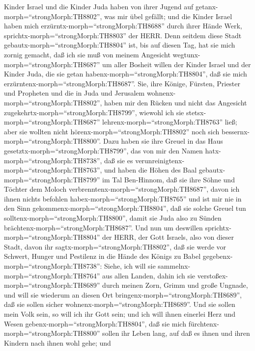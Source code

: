 Kinder Israel und die Kinder Juda haben von ihrer Jugend auf
getanx-morph=``strongMorph:TH8802'', was mir übel gefällt; und die
Kinder Israel haben mich erzürntx-morph=``strongMorph:TH8688'' durch
ihrer Hände Werk, sprichtx-morph=``strongMorph:TH8803'' der HERR.
 Denn seitdem diese Stadt
gebautx-morph=``strongMorph:TH8804'' ist, bis auf diesen Tag, hat sie
mich zornig gemacht, daß ich sie muß von meinem Angesicht
wegtunx-morph=``strongMorph:TH8687''  um aller Bosheit
willen der Kinder Israel und der Kinder Juda, die sie getan
habenx-morph=``strongMorph:TH8804'', daß sie mich
erzürntenx-morph=``strongMorph:TH8687''. Sie, ihre Könige, Fürsten,
Priester und Propheten und die in Juda und Jerusalem
wohnenx-morph=``strongMorph:TH8802'',  haben mir den Rücken
und nicht das Angesicht zugekehrtx-morph=``strongMorph:TH8799'', wiewohl
ich sie stetsx-morph=``strongMorph:TH8687''
lehrenx-morph=``strongMorph:TH8763'' ließ; aber sie wollten nicht
hörenx-morph=``strongMorph:TH8802'' noch sich
bessernx-morph=``strongMorph:TH8800''.  Dazu haben sie ihre
Greuel in das Haus gesetztx-morph=``strongMorph:TH8799'', das von mir
den Namen hatx-morph=``strongMorph:TH8738'', daß sie es
verunreinigtenx-morph=``strongMorph:TH8763'',  und haben
die Höhen des Baal gebautx-morph=``strongMorph:TH8799'' im Tal
Ben-Hinnom, daß sie ihre Söhne und Töchter dem Moloch
verbrenntenx-morph=``strongMorph:TH8687'', davon ich ihnen nichts
befohlen habex-morph=``strongMorph:TH8765'' und ist mir nie in den Sinn
gekommenx-morph=``strongMorph:TH8804'', daß sie solche Greuel tun
solltenx-morph=``strongMorph:TH8800'', damit sie Juda also zu Sünden
brächtenx-morph=``strongMorph:TH8687''.  Und nun um
deswillen sprichtx-morph=``strongMorph:TH8804'' der HERR, der Gott
Israels, also von dieser Stadt, davon ihr
sagtx-morph=``strongMorph:TH8802'', daß sie werde vor Schwert, Hunger
und Pestilenz in die Hände des Königs zu Babel
gegebenx-morph=``strongMorph:TH8738'':  Siehe, ich will sie
sammelnx-morph=``strongMorph:TH8764'' aus allen Landen, dahin ich sie
verstoßex-morph=``strongMorph:TH8689'' durch meinen Zorn, Grimm und
große Ungnade, und will sie wiederum an diesen Ort
bringenx-morph=``strongMorph:TH8689'', daß sie sollen sicher
wohnenx-morph=``strongMorph:TH8689''.  Und sie sollen mein
Volk sein, so will ich ihr Gott sein;  und ich will ihnen
einerlei Herz und Wesen gebenx-morph=``strongMorph:TH8804'', daß sie
mich fürchtenx-morph=``strongMorph:TH8800'' sollen ihr Leben lang, auf
daß es ihnen und ihren Kindern nach ihnen wohl gehe;  und
